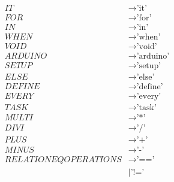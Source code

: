 \begin{align*}
    IT                      & \to \text{'it'}                                                                       \\
    FOR                     & \to \text{'for'}                                                                      \\
    IN                      & \to \text{'in'}                                                                       \\
    WHEN                    & \to \text{'when'}                                                                     \\
    VOID                    & \to \text{'void'}                                                                     \\
    ARDUINO                 & \to \text{'arduino'}                                                                  \\
    SETUP                   & \to \text{'setup'}                                                                    \\
    ELSE                    & \to \text{'else'}                                                                     \\
    DEFINE                  & \to \text{'define'}                                                                   \\
    EVERY                   & \to \text{'every'}                                                                   \\
    TASK                    & \to \text{'task'}                                                                   \\
    MULTI                   & \to \text{'*'}                                                                        \\
    DIVI                    & \to \text{'/'}                                                                        \\
    PLUS                    & \to \text{'+'}                                                                        \\
    MINUS                   & \to \text{'-'}                                                                        \\
    RELATIONEQOPERATIONS    & \to \text{'=='}                                                                       \\
                            & \mid \text{'!='}                                                                      \\

\end{align*}
